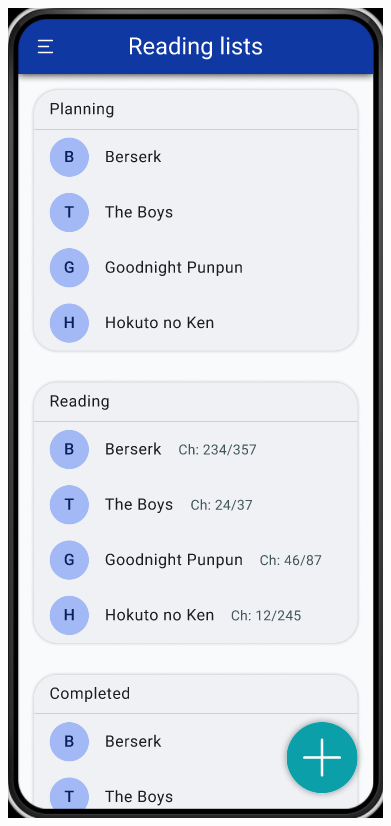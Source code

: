 \documentclass{report}
\begin{document}
\begin{center}
   \includegraphics[scale=0.4]{reading_list.png}
\end{center}
\end{document}
